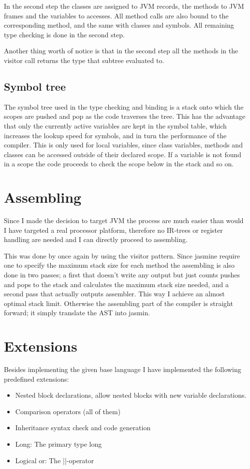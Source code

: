 \documentclass[a4paper,11pt]{article}
\begin{document}
  In the second step the classes are assigned to JVM records, the methods to JVM frames and the variables to accesses. All method calls are also bound to the corresponding method, and the same with classes and symbols.
  All remaining type checking is done in the second step.

  Another thing worth of notice is that in the second step all the methods in the visitor call returns the type that subtree evaluated to.

  \subsection{Symbol tree}
  The symbol tree used in the type checking and binding is a stack onto which the scopes are pushed and pop as the code traverses the tree. This has the advantage that only the currently active variables are
  kept in the symbol table, which increases the lookup speed for symbols, and in turn the performance of the compiler. This is only used for local variables, since class variables, methods and classes can be accessed outside of their declared scope. If a variable is not found in a scope
  the code proceeds to check the scope below in the stack and so on.

  \section{Assembling}
  Since I made the decision to target JVM the process are much easier than would I have targeted a real processor platform, therefore no IR-trees or register handling are needed and I can directly proceed to assembling.

  This was done by once again by using the visitor pattern. Since jasmine require one to specify the maximum stack size for each method the assembling is also done in two passes; a first that doesn't write any output but just counts pushes and pops to the stack and calculates the maximum stack size needed, 
  and a second pass that actually outputs assembler. This way I achieve an almost optimal stack limit. Otherwise the assembling part of the compiler is straight forward; it simply translate the AST into jasmin.

  \section{Extensions}
  Besides implementing the given base language I have implemented the following predefined extensions:
  \begin{itemize}
     \item Nested block declarations, allow nested blocks with new variable declarations.
     \item Comparison operators (all of them)
     \item Inheritance syntax check and code generation
     \item Long: The primary type long
     \item Logical or: The ||-operator
  \end{itemize}
\end{document}
